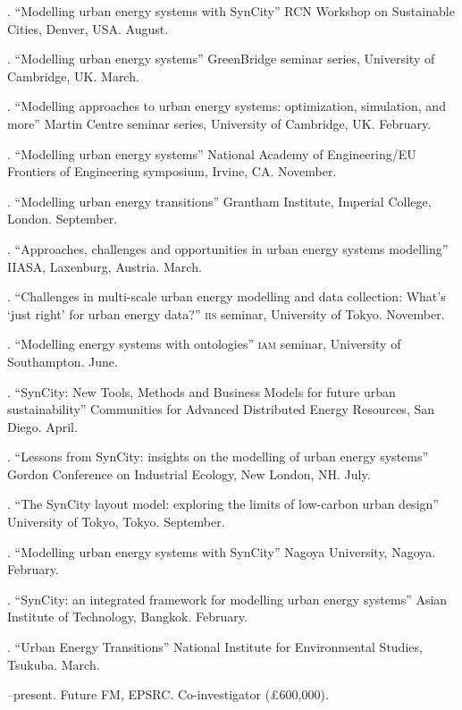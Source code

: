 \documentclass[11pt,a4paper]{article}
\begin{document}
. ``Modelling urban energy systems with SynCity'' RCN Workshop on Sustainable Cities, Denver, USA.  August.

. ``Modelling urban energy systems'' GreenBridge seminar series, University of Cambridge, UK. March.

. ``Modelling approaches to urban energy systems: optimization, simulation, and more'' Martin Centre seminar series, University of Cambridge, UK. February.

. ``Modelling urban energy systems'' National Academy of Engineering/EU Frontiers of Engineering symposium, Irvine, CA. November.

. ``Modelling urban energy transitions'' Grantham Institute, Imperial College, London. September.

. ``Approaches, challenges and opportunities in urban energy systems modelling'' IIASA, Laxenburg, Austria. March.

. ``Challenges in multi-scale urban energy modelling and data collection: What's `just right' for urban energy data?'' \textsc{iis} seminar, University of Tokyo. November.

. ``Modelling energy systems with ontologies'' \textsc{iam} seminar, University of Southampton. June.

. ``SynCity: New Tools, Methods and Business Models for future urban sustainability'' Communities for Advanced Distributed Energy Resources, San Diego.  April.

. ``Lessons from SynCity: insights on the modelling of urban energy systems'' Gordon Conference on Industrial Ecology, New London, NH.  July.

. ``The SynCity layout model: exploring the limits of low-carbon urban design'' University of Tokyo, Tokyo.  September.

. ``Modelling urban energy systems with SynCity'' Nagoya University, Nagoya. February.

. ``SynCity: an integrated framework for modelling urban energy systems'' Asian Institute of Technology, Bangkok. February.

. ``Urban Energy Transitions'' National Institute for Environmental Studies, Tsukuba.  March.


\bigskip

\noindent{}%
%
%
--present.  Future FM, EPSRC.  Co-investigator (£600,000).
\end{document}
